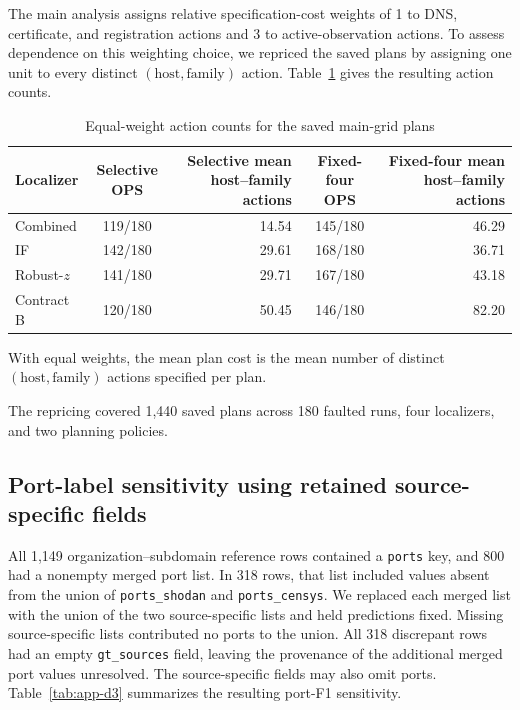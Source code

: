 \documentclass[sn-basic]{sn-jnl}%
\theoremstyle{thmstyleone}%
\theoremstyle{thmstyletwo}%
\theoremstyle{thmstylethree}%
\begin{document}
\begin{appendices}
The main analysis assigns relative specification-cost weights of 1 to DNS, certificate, and registration actions and 3 to active-observation actions. To assess dependence on this weighting choice, we repriced the saved plans by assigning one unit to every distinct \((\mathrm{host},\mathrm{family})\) action. Table~\ref{tab:app-d2} gives the resulting action counts.

\begin{table}[htbp]
\centering
\caption{Equal-weight action counts for the saved main-grid plans}
\label{tab:app-d2}
\small
\setlength{\tabcolsep}{3pt}
\renewcommand{\arraystretch}{1.1}
\begin{tabularx}{\linewidth}{@{}Xcrcr@{}}
\toprule
Localizer & \shortstack{Selective\\OPS} & \shortstack{Selective mean\\host--family actions} & \shortstack{Fixed-four\\OPS} & \shortstack{Fixed-four mean\\host--family actions} \\
\midrule
Combined & 119/180 & 14.54 & 145/180 & 46.29 \\
IF & 142/180 & 29.61 & 168/180 & 36.71 \\
Robust-\(z\) & 141/180 & 29.71 & 167/180 & 43.18 \\
Contract B & 120/180 & 50.45 & 146/180 & 82.20 \\
\bottomrule
\end{tabularx}
\end{table}

With equal weights, the mean plan cost is the mean number of distinct \((\mathrm{host},\mathrm{family})\) actions specified per plan.

The repricing covered 1,440 saved plans across 180 faulted runs, four localizers, and two planning policies.

\subsection{Port-label sensitivity using retained source-specific fields}\label{app:d-3}

All 1,149 organization--subdomain reference rows contained a \texttt{ports} key, and 800 had a nonempty merged port list. In 318 rows, that list included values absent from the union of \texttt{ports\_shodan} and \texttt{ports\_censys}. We replaced each merged list with the union of the two source-specific lists and held predictions fixed. Missing source-specific lists contributed no ports to the union. All 318 discrepant rows had an empty \texttt{gt\_sources} field, leaving the provenance of the additional merged port values unresolved. The source-specific fields may also omit ports. Table~\ref{tab:app-d3} summarizes the resulting port-F1 sensitivity.


\end{appendices}
\end{document}
